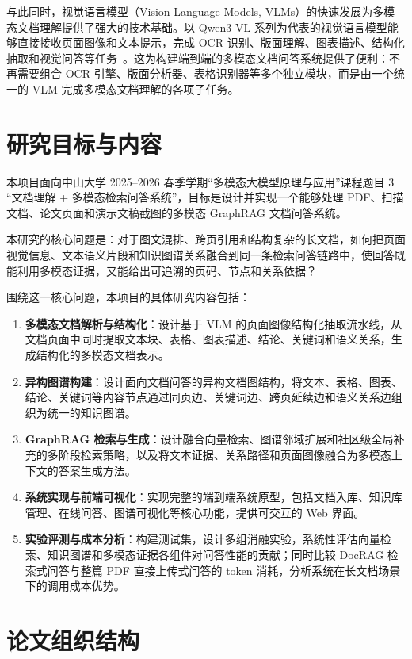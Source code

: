 与此同时，视觉语言模型（Vision-Language Models, VLMs）的快速发展为多模态文档理解提供了强大的技术基础。以 Qwen3-VL 系列为代表的视觉语言模型能够直接接收页面图像和文本提示，完成 OCR 识别、版面理解、图表描述、结构化抽取和视觉问答等任务~\cite{qwen2025qwen3vl}。这为构建端到端的多模态文档问答系统提供了便利：不再需要组合 OCR 引擎、版面分析器、表格识别器等多个独立模块，而是由一个统一的 VLM 完成多模态文档理解的各项子任务。

\section{研究目标与内容}\label{sec:objectives}

本项目面向中山大学 2025--2026 春季学期``多模态大模型原理与应用''课程题目 3 ``文档理解 + 多模态检索问答系统''，目标是设计并实现一个能够处理 PDF、扫描文档、论文页面和演示文稿截图的多模态 GraphRAG 文档问答系统。

本研究的核心问题是：对于图文混排、跨页引用和结构复杂的长文档，如何把页面视觉信息、文本语义片段和知识图谱关系融合到同一条检索问答链路中，使回答既能利用多模态证据，又能给出可追溯的页码、节点和关系依据？

围绕这一核心问题，本项目的具体研究内容包括：

\begin{enumerate}[label=（\arabic*）]
\item \textbf{多模态文档解析与结构化}：设计基于 VLM 的页面图像结构化抽取流水线，从文档页面中同时提取文本块、表格、图表描述、结论、关键词和语义关系，生成结构化的多模态文档表示。
\item \textbf{异构图谱构建}：设计面向文档问答的异构文档图结构，将文本、表格、图表、结论、关键词等内容节点通过同页边、关键词边、跨页延续边和语义关系边组织为统一的知识图谱。
\item \textbf{GraphRAG 检索与生成}：设计融合向量检索、图谱邻域扩展和社区级全局补充的多阶段检索策略，以及将文本证据、关系路径和页面图像融合为多模态上下文的答案生成方法。
\item \textbf{系统实现与前端可视化}：实现完整的端到端系统原型，包括文档入库、知识库管理、在线问答、图谱可视化等核心功能，提供可交互的 Web 界面。
\item \textbf{实验评测与成本分析}：构建测试集，设计多组消融实验，系统性评估向量检索、知识图谱和多模态证据各组件对问答性能的贡献；同时比较 DocRAG 检索式问答与整篇 PDF 直接上传式问答的 token 消耗，分析系统在长文档场景下的调用成本优势。
\end{enumerate}

\section{论文组织结构}\label{sec:organization}

